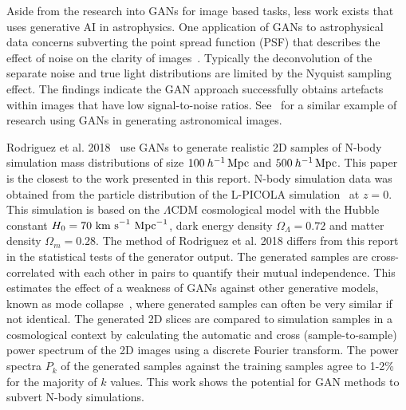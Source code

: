 \documentclass[twocolumn]{article}
\numberwithin{equation}{section}
\begin{document}
Aside from the research into GANs for image based tasks, less work exists that uses generative AI in astrophysics. One 
application of GANs to astrophysical data concerns subverting the point spread function (PSF) that describes the effect 
of noise on the clarity of images~\cite{gal_im_gen3}. Typically the deconvolution of the separate noise and true light 
distributions are limited by the Nyquist sampling effect. The findings indicate the GAN approach successfully obtains 
artefacts within images that have low signal-to-noise ratios. See~\cite{gal_im_gen2} for a similar example of research 
using GANs in generating astronomical images.

Rodriguez et al. 2018~\cite{web_gan} use GANs to generate realistic 2D samples of N-body simulation mass distributions 
of size $100 \: h^{-1} \,\textup{Mpc}$ and $500 \: h^{-1} \,\textup{Mpc}$. This paper is the closest to the work 
presented in this report. N-body simulation data was obtained from the particle distribution of the L-PICOLA 
simulation~\cite{LPICOLA} at $z=0$. This simulation is based on the $\Lambda \text{CDM}$ cosmological model with 
the Hubble constant $H_0=70\textup{ km s}^{-1}\textup{ Mpc}^{-1}$, dark energy density $\Omega_\Lambda=0.72$ and
matter density $\Omega_m=0.28$. The method of Rodriguez et al. 2018 differs from this report in the statistical 
tests of the generator output. The generated samples are cross-correlated with each other in pairs to quantify 
their mutual independence. This estimates the effect of a weakness of GANs against other generative models, known
as mode collapse~\cite{gf_gan}, where generated samples can often be very similar if not identical. The generated 
2D slices are compared to simulation samples in a cosmological context by calculating the automatic and cross 
(sample-to-sample) power spectrum of the 2D images using a discrete Fourier transform. The power spectra $P_k$ 
of the generated samples against the training samples agree to 1-2\% 
for the majority of $k$ values. This work shows the potential for GAN methods to subvert N-body simulations. 
\end{document}
